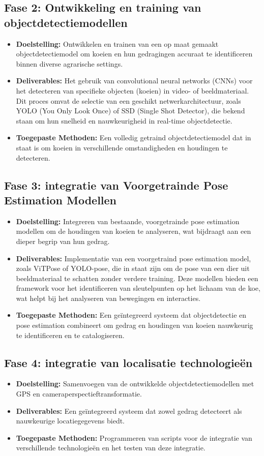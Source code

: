 \subsection{Fase 2: Ontwikkeling en training van objectdetectiemodellen}
\begin{itemize}
    \item \textbf{Doelstelling:} Ontwikkelen en trainen van een op maat gemaakt objectdetectiemodel om koeien en hun gedragingen accuraat te identificeren binnen diverse agrarische settings.
    \item \textbf{Deliverables:} Het gebruik van convolutional neural networks (CNNs) voor het detecteren van specifieke objecten (koeien) in video- of beeldmateriaal. Dit proces omvat de selectie van een geschikt netwerkarchitectuur, zoals YOLO (You Only Look Once) of SSD (Single Shot Detector), die bekend staan om hun snelheid en nauwkeurigheid in real-time objectdetectie.
    \item \textbf{Toegepaste Methoden:} Een volledig getraind objectdetectiemodel dat in staat is om koeien in verschillende omstandigheden en houdingen te detecteren.
\end{itemize}
\subsection{Fase 3: integratie van Voorgetrainde Pose Estimation Modellen}
\begin{itemize}
    \item \textbf{Doelstelling:} Integreren van bestaande, voorgetrainde pose estimation modellen om de houdingen van koeien te analyseren, wat bijdraagt aan een dieper begrip van hun gedrag.
    \item \textbf{Deliverables:}  Implementatie van een voorgetraind pose estimation model, zoals ViTPose of YOLO-pose, die in staat zijn om de pose van een dier uit beeldmateriaal te schatten zonder verdere training. Deze modellen bieden een framework voor het identificeren van sleutelpunten op het lichaam van de koe, wat helpt bij het analyseren van bewegingen en interacties.
    \item \textbf{Toegepaste Methoden:} Een geïntegreerd systeem dat objectdetectie en pose estimation combineert om gedrag en houdingen van koeien nauwkeurig te identificeren en te catalogiseren.
\end{itemize}
\subsection{Fase 4: integratie van localisatie technologieën}
\begin{itemize}
    \item \textbf{Doelstelling:} Samenvoegen van de ontwikkelde objectdetectiemodellen met GPS en cameraperspectieftransformatie.
    \item \textbf{Deliverables:}  Een geïntegreerd systeem dat zowel gedrag detecteert als nauwkeurige locatiegegevens biedt.
    \item \textbf{Toegepaste Methoden:} Programmeren van scripts voor de integratie van verschillende technologieën en het testen van deze integratie.
\end{itemize}
